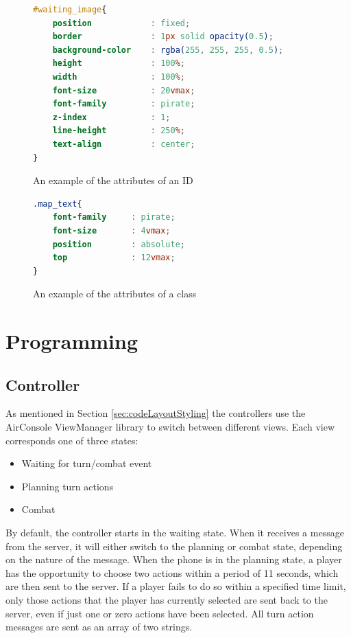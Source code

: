 \begin{figure}
\begin{lstlisting}[language=CSS]
#waiting_image{
	position            : fixed;
	border              : 1px solid opacity(0.5);
	background-color    : rgba(255, 255, 255, 0.5);
	height              : 100%;
	width               : 100%;
	font-size           : 20vmax;
	font-family         : pirate;
	z-index             : 1;
	line-height         : 250%;
	text-align          : center;
}
\end{lstlisting} 
\caption{An example of the attributes of an ID \label{fig:IDex}}
\end{figure}

\begin{figure}
\begin{lstlisting}[language=CSS]
.map_text{
	font-family     : pirate;
	font-size       : 4vmax;
	position        : absolute;
	top	            : 12vmax;
}
\end{lstlisting} 
\caption{An example of the attributes of a class \label{fig:Classex}}
\end{figure}

\section{Programming}\label{sec:codeProgramming}

\subsection{Controller}\label{sec:progController}
As mentioned in Section \ref{sec:codeLayoutStyling} the controllers use the AirConsole ViewManager library to switch between different views. Each view corresponds one of three states:
\begin{itemize}
	\item Waiting for turn/combat event
	\item Planning turn actions
	\item Combat
\end{itemize}

By default, the controller starts in the waiting state. When it receives a message from the server, it will either switch to the planning or combat state, depending on the nature of the message. When the phone is in the planning state, a player has the opportunity to choose two actions within a period of 11 seconds, which are then sent to the server. If a player fails to do so within a specified time limit, only those actions that the player has currently selected are sent back to the server, even if just one or zero actions have been selected. All turn action messages are sent as an array of two strings.

